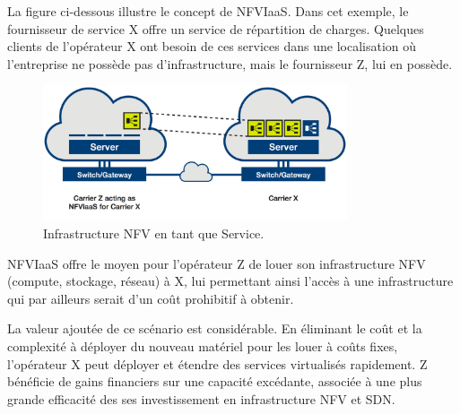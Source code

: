 La figure ci-dessous illustre le concept de NFVIaaS. Dans cet exemple, le fournisseur de service X offre un service de répartition de charges. Quelques clients de l'opérateur X ont besoin de ces services dans une localisation où l'entreprise ne possède pas d'infrastructure, mais le fournisseur Z, lui en possède.\\



\begin{figure}[h]
\begin{center}
\includegraphics[width=0.8\textwidth]{images/NFVIaaS} 
\caption{Infrastructure NFV en tant que Service. \cite{OFSDNNFVand}} \label{nfviaas}
\end{center}
\end{figure} 

NFVIaaS offre le moyen pour l'opérateur Z de louer son infrastructure NFV (compute, stockage, réseau) à X, lui permettant ainsi l'accès à une infrastructure qui par ailleurs serait d'un coût prohibitif à obtenir.

La valeur ajoutée de ce scénario est considérable. En éliminant le coût et la complexité à déployer du nouveau matériel pour les louer à coûts fixes, l'opérateur X peut déployer et étendre des services virtualisés rapidement. Z bénéficie de gains financiers sur une capacité excédante, associée à une plus grande efficacité des ses investissement en infrastructure NFV et SDN.


